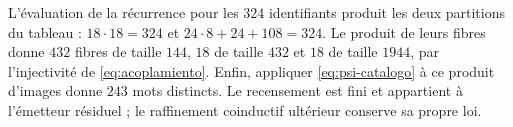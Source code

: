 L’évaluation de la récurrence pour les \(324\) identifiants produit
les deux partitions du tableau : \(18\cdot18=324\) et
\(24\cdot8+24+108=324\). Le produit de leurs fibres donne
\(432\) fibres de taille \(144\), \(18\) de taille \(432\) et \(18\)
de taille \(1944\), par l’injectivité de \eqref{eq:acoplamiento}.
Enfin, appliquer \eqref{eq:psi-catalogo} à ce produit d’images
donne \(243\) mots distincts. Le recensement est fini et appartient à l’émetteur
résiduel ; le raffinement coinductif ultérieur conserve sa propre loi.


